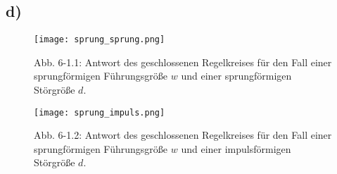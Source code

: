 \documentclass[11pt]{scrartcl} %
\begin{document}
\subsection*{d)}
\begin{figure}[H]
\centering
\texttt{[image: sprung\_sprung.png]}
\captionsetup{labelformat=empty}
\caption{Abb. 6-1.1: Antwort des geschlossenen Regelkreises für den Fall einer sprungförmigen Führungsgröße $w$ und einer sprungförmigen Störgröße $d$.}
\end{figure}

\begin{figure}[H]
\centering
\texttt{[image: sprung\_impuls.png]}
\captionsetup{labelformat=empty}
\caption{Abb. 6-1.2: Antwort des geschlossenen Regelkreises für den Fall einer sprungförmigen Führungsgröße $w$ und einer impulsförmigen Störgröße $d$.}
\end{figure}
\end{document}
